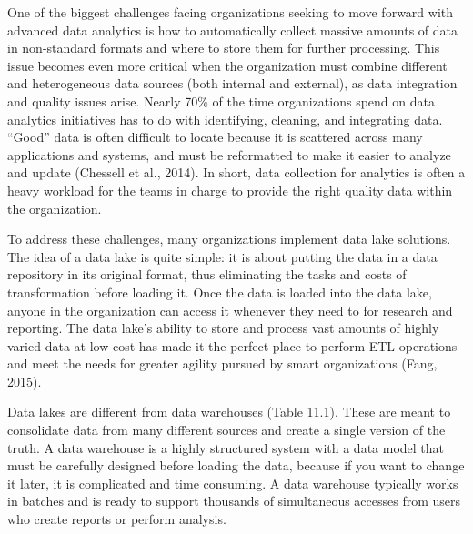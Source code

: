 \documentclass[
  letterpaper,
  DIV=11,
  numbers=noendperiod]{scrreprt}
\begin{document}
One of the biggest challenges facing organizations seeking to move
forward with advanced data analytics is how to automatically collect
massive amounts of data in non-standard formats and where to store them
for further processing. This issue becomes even more critical when the
organization must combine different and heterogeneous data sources (both
internal and external), as data integration and quality issues arise.
Nearly 70\% of the time organizations spend on data analytics
initiatives has to do with identifying, cleaning, and integrating data.
``Good'' data is often difficult to locate because it is scattered
across many applications and systems, and must be reformatted to make it
easier to analyze and update (Chessell et al., 2014). In short, data
collection for analytics is often a heavy workload for the teams in
charge to provide the right quality data within the organization.

To address these challenges, many organizations implement data lake
solutions. The idea of a data lake is quite simple: it is about putting
the data in a data repository in its original format, thus eliminating
the tasks and costs of transformation before loading it. Once the data
is loaded into the data lake, anyone in the organization can access it
whenever they need to for research and reporting. The data lake's
ability to store and process vast amounts of highly varied data at low
cost has made it the perfect place to perform ETL operations and meet
the needs for greater agility pursued by smart organizations (Fang,
2015).

Data lakes are different from data warehouses (Table 11.1). These are
meant to consolidate data from many different sources and create a
single version of the truth. A data warehouse is a highly structured
system with a data model that must be carefully designed before loading
the data, because if you want to change it later, it is complicated and
time consuming. A data warehouse typically works in batches and is ready
to support thousands of simultaneous accesses from users who create
reports or perform analysis.
\end{document}
